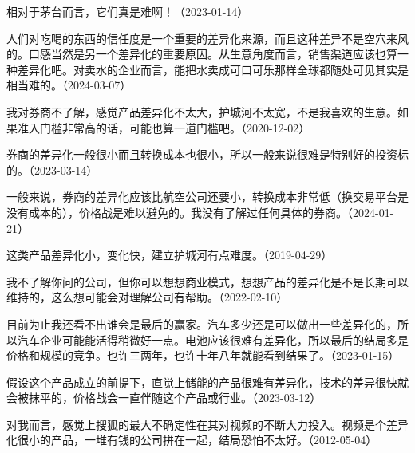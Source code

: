 相对于茅台而言，它们真是难啊！（2023-01-14）


人们对吃喝的东西的信任度是一个重要的差异化来源，而且这种差异不是空穴来风的。口感当然是另一个差异化的重要原因。从生意角度而言，销售渠道应该也算一种差异化吧。对卖水的企业而言，能把水卖成可口可乐那样全球都随处可见其实是相当难的。（2024-03-07）


我对券商不了解，感觉产品差异化不太大，护城河不太宽，不是我喜欢的生意。如果准入门槛非常高的话，可能也算一道门槛吧。（2020-12-02）

券商的差异化一般很小而且转换成本也很小，所以一般来说很难是特别好的投资标的。（2023-03-14）

一般来说，券商的差异化应该比航空公司还要小，转换成本非常低（换交易平台是没有成本的），价格战是难以避免的。我没有了解过任何具体的券商。（2024-01-21）


这类产品差异化小，变化快，建立护城河有点难度。（2019-04-29）


我不了解你问的公司，但你可以想想商业模式，想想产品的差异化是不是长期可以维持的，这么想可能会对理解公司有帮助。（2022-02-10）


目前为止我还看不出谁会是最后的赢家。汽车多少还是可以做出一些差异化的，所以汽车企业可能能活得稍微好一点。电池应该很难有差异化，所以最后的结局多是价格和规模的竞争。也许三两年，也许十年八年就能看到结果了。（2023-01-15）


假设这个产品成立的前提下，直觉上储能的产品很难有差异化，技术的差异很快就会被抹平的，价格战会一直伴随这个产品或行业。（2023-03-12）


对我而言，感觉上搜狐的最大不确定性在其对视频的不断大力投入。视频是个差异化很小的产品，一堆有钱的公司拼在一起，结局恐怕不太好。（2012-05-04）


